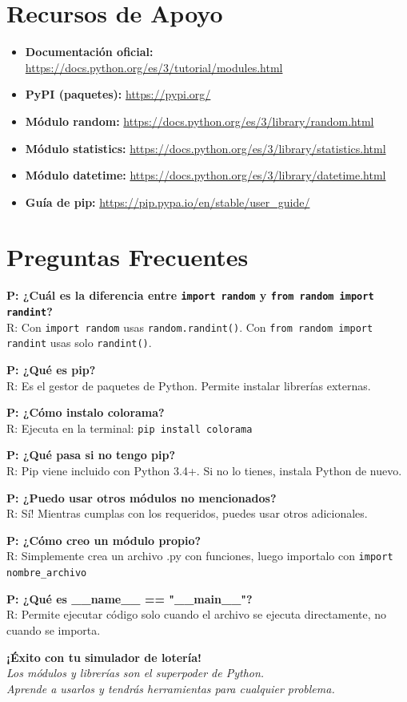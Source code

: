 \documentclass[12pt,a4paper]{article}
\begin{document}
\section{Recursos de Apoyo}

\begin{itemize}[leftmargin=*]
    \item \textbf{Documentación oficial:} \url{https://docs.python.org/es/3/tutorial/modules.html}
    \item \textbf{PyPI (paquetes):} \url{https://pypi.org/}
    \item \textbf{Módulo random:} \url{https://docs.python.org/es/3/library/random.html}
    \item \textbf{Módulo statistics:} \url{https://docs.python.org/es/3/library/statistics.html}
    \item \textbf{Módulo datetime:} \url{https://docs.python.org/es/3/library/datetime.html}
    \item \textbf{Guía de pip:} \url{https://pip.pypa.io/en/stable/user_guide/}
\end{itemize}

\section{Preguntas Frecuentes}

\textbf{P: ¿Cuál es la diferencia entre \texttt{import random} y \texttt{from random import randint}?}\\
R: Con \texttt{import random} usas \texttt{random.randint()}. Con \texttt{from random import randint} usas solo \texttt{randint()}.

\textbf{P: ¿Qué es pip?}\\
R: Es el gestor de paquetes de Python. Permite instalar librerías externas.

\textbf{P: ¿Cómo instalo colorama?}\\
R: Ejecuta en la terminal: \texttt{pip install colorama}

\textbf{P: ¿Qué pasa si no tengo pip?}\\
R: Pip viene incluido con Python 3.4+. Si no lo tienes, instala Python de nuevo.

\textbf{P: ¿Puedo usar otros módulos no mencionados?}\\
R: Sí! Mientras cumplas con los requeridos, puedes usar otros adicionales.

\textbf{P: ¿Cómo creo un módulo propio?}\\
R: Simplemente crea un archivo .py con funciones, luego importalo con \texttt{import nombre\_archivo}

\textbf{P: ¿Qué es \_\_name\_\_ == "\_\_main\_\_"?}\\
R: Permite ejecutar código solo cuando el archivo se ejecuta directamente, no cuando se importa.

\vspace{1cm}

\begin{center}
\textbf{¡Éxito con tu simulador de lotería!}\\
\textit{Los módulos y librerías son el superpoder de Python.\\
Aprende a usarlos y tendrás herramientas para cualquier problema.}
\end{center}
\end{document}
